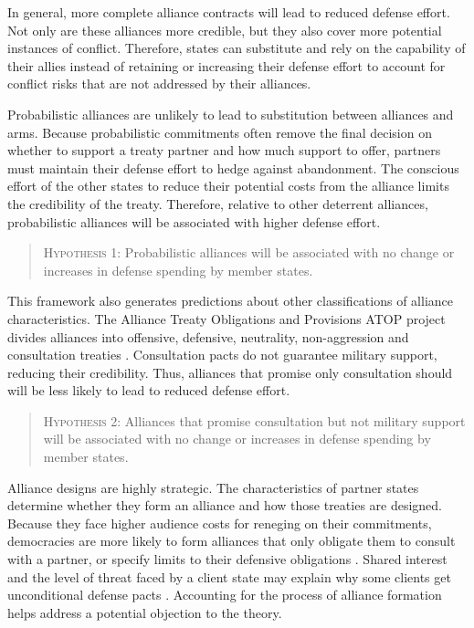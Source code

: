 \documentclass[12pt]{article}
\begin{document}
In general, more complete alliance contracts will lead to reduced defense effort. Not only are these alliances more credible, but they also cover more potential instances of conflict. Therefore, states can substitute and rely on the capability of their allies instead of retaining or increasing their defense effort to account for conflict risks that are not addressed by their alliances. 

Probabilistic alliances are unlikely to lead to substitution between alliances and arms. Because probabilistic commitments often remove the final decision on whether to support a treaty partner and how much support to offer, partners must maintain their defense effort to hedge against abandonment. The conscious effort of the other states to reduce their potential costs from the alliance limits the credibility of the treaty. Therefore, relative to other deterrent alliances, probabilistic alliances will be associated with higher defense effort. 

\begin{quote}
\textsc{Hypothesis 1}: Probabilistic alliances will be associated with no change or increases in defense spending by member states. 
\end{quote}

This framework also generates predictions about other classifications of alliance characteristics. The Alliance Treaty Obligations and Provisions ATOP project divides alliances into offensive, defensive, neutrality, non-aggression and consultation treaties \citet{Leedsetal2002}. Consultation pacts do not guarantee military support, reducing their credibility. Thus, alliances that promise only consultation should will be less likely to lead to reduced defense effort. 

\begin{quote}
\textsc{Hypothesis 2}: Alliances that promise consultation but not military support will be associated with no change or increases in defense spending by member states. 
\end{quote}

Alliance designs are highly strategic. The characteristics of partner states determine whether they form an alliance and how those treaties are designed. Because they face higher audience costs for reneging on their commitments, democracies are more likely to form alliances that only obligate them to consult with a partner, or specify limits to their defensive obligations \citep{Chibaetal2015}. Shared interest and the level of threat faced by a client state may explain why some clients get unconditional defense pacts \citep{Yarhi-Miloetal2016}. Accounting for the process of alliance formation helps address a potential objection to the theory.
\end{document}
